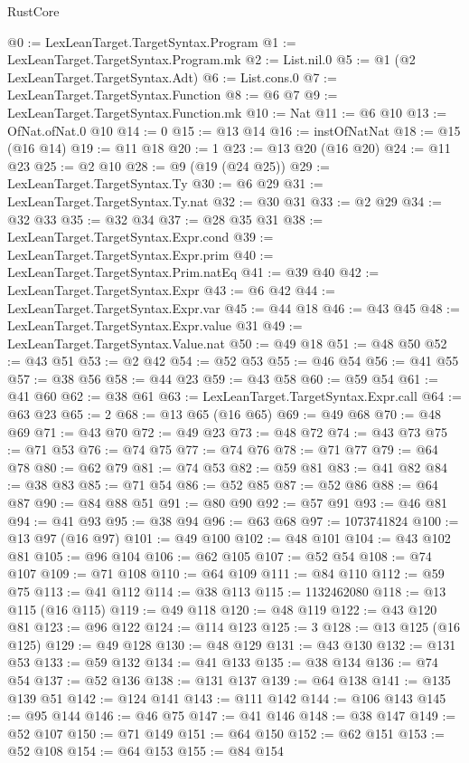 \begin{lexlean}{RustCore}
\begin{coremodule}
@0 := LexLeanTarget.TargetSyntax.Program
@1 := LexLeanTarget.TargetSyntax.Program.mk
@2 := List.nil.{0}
@5 := @1 (@2 LexLeanTarget.TargetSyntax.Adt)
@6 := List.cons.{0}
@7 := LexLeanTarget.TargetSyntax.Function
@8 := @6 @7
@9 := LexLeanTarget.TargetSyntax.Function.mk
@10 := Nat
@11 := @6 @10
@13 := OfNat.ofNat.{0} @10
@14 := 0
@15 := @13 @14
@16 := instOfNatNat
@18 := @15 (@16 @14)
@19 := @11 @18
@20 := 1
@23 := @13 @20 (@16 @20)
@24 := @11 @23
@25 := @2 @10
@28 := @9 (@19 (@24 @25))
@29 := LexLeanTarget.TargetSyntax.Ty
@30 := @6 @29
@31 := LexLeanTarget.TargetSyntax.Ty.nat
@32 := @30 @31
@33 := @2 @29
@34 := @32 @33
@35 := @32 @34
@37 := @28 @35 @31
@38 := LexLeanTarget.TargetSyntax.Expr.cond
@39 := LexLeanTarget.TargetSyntax.Expr.prim
@40 := LexLeanTarget.TargetSyntax.Prim.natEq
@41 := @39 @40
@42 := LexLeanTarget.TargetSyntax.Expr
@43 := @6 @42
@44 := LexLeanTarget.TargetSyntax.Expr.var
@45 := @44 @18
@46 := @43 @45
@48 := LexLeanTarget.TargetSyntax.Expr.value @31
@49 := LexLeanTarget.TargetSyntax.Value.nat
@50 := @49 @18
@51 := @48 @50
@52 := @43 @51
@53 := @2 @42
@54 := @52 @53
@55 := @46 @54
@56 := @41 @55
@57 := @38 @56
@58 := @44 @23
@59 := @43 @58
@60 := @59 @54
@61 := @41 @60
@62 := @38 @61
@63 := LexLeanTarget.TargetSyntax.Expr.call
@64 := @63 @23
@65 := 2
@68 := @13 @65 (@16 @65)
@69 := @49 @68
@70 := @48 @69
@71 := @43 @70
@72 := @49 @23
@73 := @48 @72
@74 := @43 @73
@75 := @71 @53
@76 := @74 @75
@77 := @74 @76
@78 := @71 @77
@79 := @64 @78
@80 := @62 @79
@81 := @74 @53
@82 := @59 @81
@83 := @41 @82
@84 := @38 @83
@85 := @71 @54
@86 := @52 @85
@87 := @52 @86
@88 := @64 @87
@90 := @84 @88 @51
@91 := @80 @90
@92 := @57 @91
@93 := @46 @81
@94 := @41 @93
@95 := @38 @94
@96 := @63 @68
@97 := 1073741824
@100 := @13 @97 (@16 @97)
@101 := @49 @100
@102 := @48 @101
@104 := @43 @102 @81
@105 := @96 @104
@106 := @62 @105
@107 := @52 @54
@108 := @74 @107
@109 := @71 @108
@110 := @64 @109
@111 := @84 @110
@112 := @59 @75
@113 := @41 @112
@114 := @38 @113
@115 := 1132462080
@118 := @13 @115 (@16 @115)
@119 := @49 @118
@120 := @48 @119
@122 := @43 @120 @81
@123 := @96 @122
@124 := @114 @123
@125 := 3
@128 := @13 @125 (@16 @125)
@129 := @49 @128
@130 := @48 @129
@131 := @43 @130
@132 := @131 @53
@133 := @59 @132
@134 := @41 @133
@135 := @38 @134
@136 := @74 @54
@137 := @52 @136
@138 := @131 @137
@139 := @64 @138
@141 := @135 @139 @51
@142 := @124 @141
@143 := @111 @142
@144 := @106 @143
@145 := @95 @144
@146 := @46 @75
@147 := @41 @146
@148 := @38 @147
@149 := @52 @107
@150 := @71 @149
@151 := @64 @150
@152 := @62 @151
@153 := @52 @108
@154 := @64 @153
@155 := @84 @154

\end{coremodule}
\end{lexlean}
